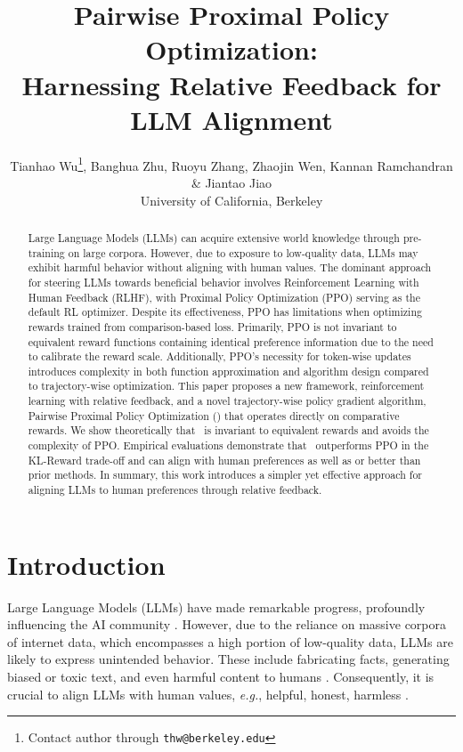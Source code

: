 \documentclass{article} %
\title{Pairwise Proximal Policy Optimization:\\Harnessing Relative Feedback for LLM Alignment}
\author{Tianhao Wu\thanks{Contact author through \texttt{thw@berkeley.edu}}, Banghua Zhu, Ruoyu Zhang, Zhaojin Wen, Kannan Ramchandran \& Jiantao Jiao\\
University of California, Berkeley
}
\newcommand{\algn}{\text{P3O}}
\begin{document}
\maketitle

\begin{abstract}
Large Language Models (LLMs) can acquire extensive world knowledge through pre-training on large corpora. However, due to exposure to low-quality data, LLMs may exhibit harmful behavior without aligning with human values. The dominant approach for steering LLMs towards beneficial behavior involves Reinforcement Learning with Human Feedback (RLHF), with Proximal Policy Optimization (PPO) serving as the default RL optimizer. Despite its effectiveness, PPO has limitations when optimizing rewards trained from comparison-based loss. Primarily, PPO is not invariant to equivalent reward functions containing identical preference information due to the need to calibrate the reward scale. Additionally, PPO's necessity for token-wise updates introduces complexity in both function approximation and algorithm design compared to trajectory-wise optimization. This paper proposes a new framework, reinforcement learning with relative feedback, and a novel trajectory-wise policy gradient algorithm, Pairwise Proximal Policy Optimization (\algn) that operates directly on comparative rewards. We show theoretically that \algn\ is invariant to equivalent rewards and avoids the complexity of PPO. Empirical evaluations demonstrate that \algn\ outperforms PPO in the KL-Reward trade-off and can align with human preferences as well as or better than prior methods. In summary, this work introduces a simpler yet effective approach for aligning LLMs to human preferences through relative feedback.
\end{abstract}

\section{Introduction}
\label{sec:introduction}
Large Language Models (LLMs) have made remarkable progress, profoundly influencing the AI community \citep{chowdhery2022palm,brown2020language,touvron2023llama,bubeck2023sparks}. However, due to the reliance on massive corpora of internet data, which encompasses a high portion of low-quality data, LLMs are likely to express unintended behavior. These include fabricating facts, generating biased or toxic text, and even harmful content to humans \citep{perez2022red,ganguli2022red}. Consequently, it is crucial to align LLMs with human values, \textit{e.g.}, helpful, honest, harmless \citep{bai2022training}. 
\end{document}

